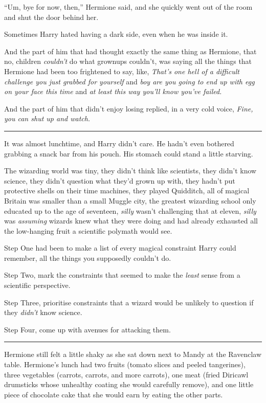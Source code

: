``Um, bye for now, then,'' Hermione said, and she quickly went out of
the room and shut the door behind her.

Sometimes Harry hated having a dark side, even when he was inside it.

And the part of him that had thought exactly the same thing as Hermione,
that no, children \emph{couldn't} do what grownups couldn't, was saying
all the things that Hermione had been too frightened to say, like,
\emph{That's one hell of a difficult challenge you just grabbed for
yourself} and \emph{boy are you going to end up with egg on your face
this time} and \emph{at least this way you'll know you've failed.}

And the part of him that didn't enjoy losing replied, in a very cold
voice, \emph{Fine, you can shut up and watch.}

\begin{center}\rule{3in}{0.4pt}\end{center}

It was almost lunchtime, and Harry didn't care. He hadn't even bothered
grabbing a snack bar from his pouch. His stomach could stand a little
starving.

The wizarding world was tiny, they didn't think like scientists, they
didn't know science, they didn't question what they'd grown up with,
they hadn't put protective shells on their time machines, they played
Quidditch, all of magical Britain was smaller than a small Muggle city,
the greatest wizarding school only educated up to the age of seventeen,
\emph{silly} wasn't challenging that at eleven, \emph{silly} was
\emph{assuming} wizards knew what they were doing and had already
exhausted all the low-hanging fruit a scientific polymath would see.

Step One had been to make a list of every magical constraint Harry could
remember, all the things you supposedly couldn't do.

Step Two, mark the constraints that seemed to make the \emph{least}
sense from a scientific perspective.

Step Three, prioritise constraints that a wizard would be unlikely to
question if they \emph{didn't} know science.

Step Four, come up with avenues for attacking them.

\begin{center}\rule{3in}{0.4pt}\end{center}

Hermione still felt a little shaky as she sat down next to Mandy at the
Ravenclaw table. Hermione's lunch had two fruits (tomato slices and
peeled tangerines), three vegetables (carrots, carrots, and more
carrots), one meat (fried Diricawl drumsticks whose unhealthy coating
she would carefully remove), and one little piece of chocolate cake that
she would earn by eating the other parts.

